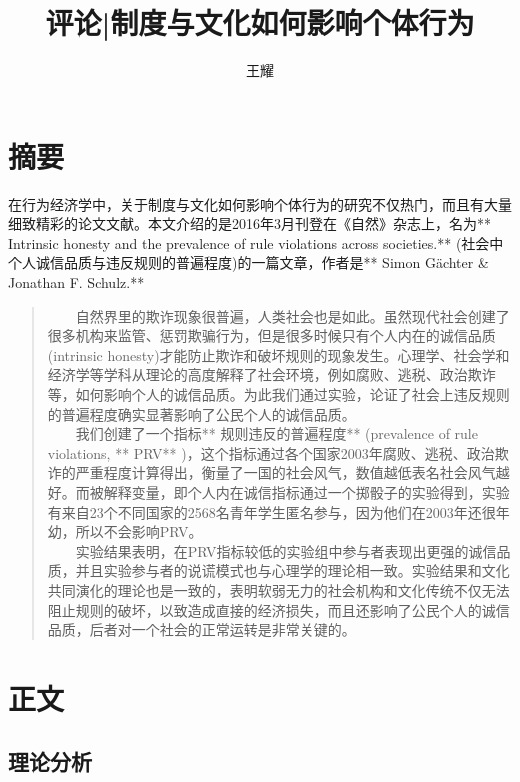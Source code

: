 \documentclass[11pt]{article}
\title{评论|制度与文化如何影响个体行为}
\author{王耀}
\begin{document}
    
    
    \maketitle
    
    

    
    \section{摘要}\label{ux6458ux8981}

    在行为经济学中，关于制度与文化如何影响个体行为的研究不仅热门，而且有大量细致精彩的论文文献。本文介绍的是2016年3月刊登在《自然》杂志上，名为**
Intrinsic honesty and the prevalence of rule violations across
societies.**
(社会中个人诚信品质与违反规则的普遍程度)的一篇文章，作者是** Simon
Gächter \& Jonathan F. Schulz.**

\begin{quote}
　　自然界里的欺诈现象很普遍，人类社会也是如此。虽然现代社会创建了很多机构来监管、惩罚欺骗行为，但是很多时候只有个人内在的诚信品质(intrinsic
honesty)才能防止欺诈和破坏规则的现象发生。心理学、社会学和经济学等学科从理论的高度解释了社会环境，例如腐败、逃税、政治欺诈等，如何影响个人的诚信品质。为此我们通过实验，论证了社会上违反规则的普遍程度确实显著影响了公民个人的诚信品质。\\
　　我们创建了一个指标** 规则违反的普遍程度** (prevalence of rule
violations, ** PRV**
)，这个指标通过各个国家2003年腐败、逃税、政治欺诈的严重程度计算得出，衡量了一国的社会风气，数值越低表名社会风气越好。而被解释变量，即个人内在诚信指标通过一个掷骰子的实验得到，实验有来自23个不同国家的2568名青年学生匿名参与，因为他们在2003年还很年幼，所以不会影响PRV。\\
　　实验结果表明，在PRV指标较低的实验组中参与者表现出更强的诚信品质，并且实验参与者的说谎模式也与心理学的理论相一致。实验结果和文化共同演化的理论也是一致的，表明软弱无力的社会机构和文化传统不仅无法阻止规则的破坏，以致造成直接的经济损失，而且还影响了公民个人的诚信品质，后者对一个社会的正常运转是非常关键的。
\end{quote}

    \section{正文}\label{ux6b63ux6587}

    \subsection{理论分析}\label{ux7406ux8bbaux5206ux6790}
\end{document}

